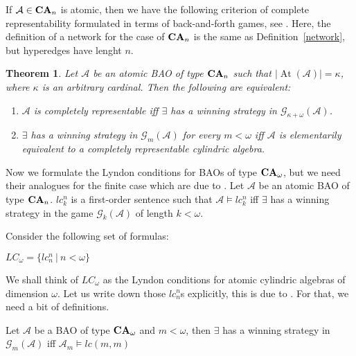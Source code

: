 \documentclass[a4paper]{article}
\theoremstyle{defin}
\theoremstyle{theorem}
\newtheorem{theorem}{Theorem}
\theoremstyle{prop}
\theoremstyle{lemma}
\theoremstyle{fact}
\theoremstyle{ex}
\theoremstyle{col}
\begin{document}
If $\mathcal{A} \in {\bf CA}_{n}$ is atomic, then we have the following criterion of complete representability formulated in terms of back-and-forth games, see \cite[Theorem 3.3.3 and Corollary 3.3.5]{hirsch2013completions}. Here, the definition of a network for the case of ${\bf CA}_n$ is the same as Definition~\ref{network}, but hyperedges have lenght $n$.

\begin{theorem}
  Let $\mathcal{A}$ be an atomic BAO of type ${\bf CA}_n$ such that $|\operatorname{At}(\mathcal{A})| = \kappa$, where $\kappa$ is an arbitrary cardinal. Then the following are equivalent:

  \begin{enumerate}
    \item $\mathcal{A}$ is completely representable iff $\exists$ has a winning strategy in $\mathcal{G}_{\kappa + \omega}(\mathcal{A})$.
    \item $\exists$ has a winning strategy in $\mathcal{G}_{m}(\mathcal{A})$ for every $m < \omega$ iff $\mathcal{A}$ is elementarily equivalent to a completely representable cylindric algebra.
  \end{enumerate}
\end{theorem}

Now we formulate the Lyndon conditions for BAOs of type ${\bf CA}_{\omega}$, but we need their analogues for the finite case which are due to \cite[Theorem 34]{hirsch1997step}. Let $\mathcal{A}$ be an atomic BAO of type ${\bf CA}_{n}$. $lc_k^n$ is a first-order sentence such that $\mathcal{A} \models lc_k^n$ iff $\exists$ has a winning strategy in the game $\mathcal{G}_k(\mathcal{A})$ of length $k < \omega$.

Consider the following set of formulas:
\begin{center}
  $LC_{\omega} = \{ lc_n^n \: | \: n < \omega \}$
\end{center}
We shall think of $LC_{\omega}$ as the Lyndon conditions for atomic cylindric algebras of dimension $\omega$. Let us write down those $lc_n^n$s explicitly, this is due to \cite[Sections 11.3 and 11.4]{hirsch1997step}. For that, we need a bit of definitions.

\begin{proposition}
  Let $\mathcal{A}$ be a BAO of type ${\bf CA}_{\omega}$ and $m < \omega$, then $\exists$ has a winning strategy in $\mathcal{G}_m(\mathcal{A})$ iff $\mathcal{A}_m \models lc(m,m)$
\end{proposition}
\end{document}
